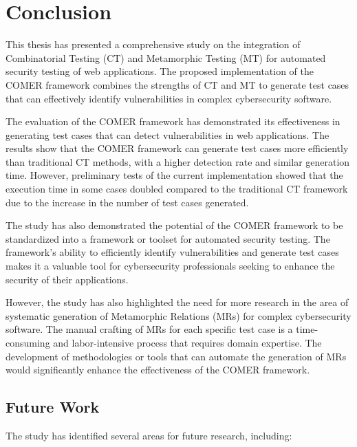 \chapter{Conclusion}
\label{ch:conclusion}

This thesis has presented a comprehensive study on the integration of Combinatorial Testing (CT) and Metamorphic Testing (MT) for automated security testing of web applications. The proposed implementation of the COMER framework combines the strengths of CT and MT to generate test cases that can effectively identify vulnerabilities in complex cybersecurity software.

The evaluation of the COMER framework has demonstrated its effectiveness in generating test cases that can detect vulnerabilities in web applications. The results show that the COMER framework can generate test cases more efficiently than traditional CT methods, with a higher detection rate and similar generation time. However, preliminary tests of the current implementation showed that the execution time in some cases doubled compared to the traditional CT framework due to the increase in the number of test cases generated.

The study has also demonstrated the potential of the COMER framework to be standardized into a framework or toolset for automated security testing. The framework's ability to efficiently identify vulnerabilities and generate test cases makes it a valuable tool for cybersecurity professionals seeking to enhance the security of their applications.

However, the study has also highlighted the need for more research in the area of systematic generation of Metamorphic Relations (MRs) for complex cybersecurity software. The manual crafting of MRs for each specific test case is a time-consuming and labor-intensive process that requires domain expertise. The development of methodologies or tools that can automate the generation of MRs would significantly enhance the effectiveness of the COMER framework.

\section{Future Work}

The study has identified several areas for future research, including:

